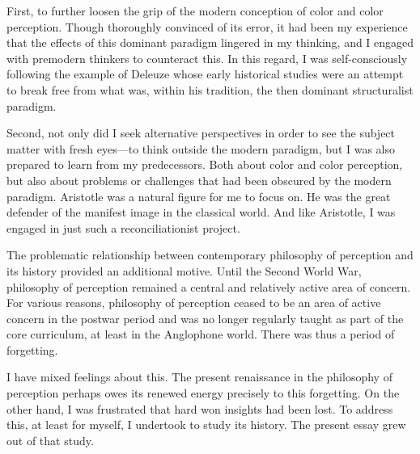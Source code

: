 First, to further loosen the grip of the modern conception of color and color perception. Though thoroughly convinced of its error, it had been my experience that the effects of this dominant paradigm lingered in my thinking, and I engaged with premodern thinkers to counteract this. In this regard, I was self-consciously following the example of Deleuze whose early historical studies were an attempt to break free from what was, within his tradition, the then dominant structuralist paradigm.

Second, not only did I seek alternative perspectives in order to see the subject matter with fresh eyes---to think outside the modern paradigm, but I was also prepared to learn from my predecessors. Both about color and color perception, but also about problems or challenges that had been obscured by the modern paradigm. Aristotle was a natural figure for me to focus on. He was the great defender of the manifest image in the classical world. And like Aristotle, I was engaged in just such a reconciliationist project.

The problematic relationship between contemporary philosophy of perception and its history provided an additional motive. Until the Second World War, philosophy of perception remained a central and relatively active area of concern. For various reasons, philosophy of perception ceased to be an area of active concern in the postwar period and was no longer regularly taught as part of the core curriculum, at least in the Anglophone world. There was thus a period of forgetting. 

I have mixed feelings about this. The present renaissance in the philosophy of perception perhaps owes its renewed energy precisely to this forgetting. On the other hand, I was frustrated that hard won insights had been lost. To address this, at least for myself, I undertook to study its history. The present essay grew out of that study.

